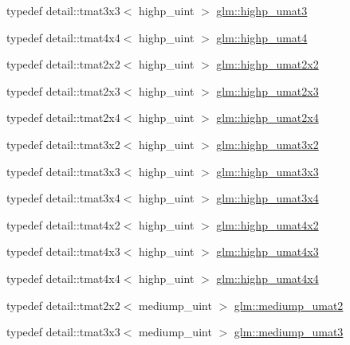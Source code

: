 \begin{DoxyCompactItemize}
\item 
typedef detail\+::tmat3x3$<$ highp\+\_\+uint $>$ \hyperlink{group__gtc__matrix__integer_ga0d2f0c76700809151e4582977bdc4c1d}{glm\+::highp\+\_\+umat3}
\item 
typedef detail\+::tmat4x4$<$ highp\+\_\+uint $>$ \hyperlink{group__gtc__matrix__integer_gabf91e4747e9aad3d2b58c79da5d9b0d3}{glm\+::highp\+\_\+umat4}
\item 
typedef detail\+::tmat2x2$<$ highp\+\_\+uint $>$ \hyperlink{group__gtc__matrix__integer_ga3d03c649a79dcf3c8b3f766e1c5e7870}{glm\+::highp\+\_\+umat2x2}
\item 
typedef detail\+::tmat2x3$<$ highp\+\_\+uint $>$ \hyperlink{group__gtc__matrix__integer_ga423c173624bfed5e27073987eecf06c2}{glm\+::highp\+\_\+umat2x3}
\item 
typedef detail\+::tmat2x4$<$ highp\+\_\+uint $>$ \hyperlink{group__gtc__matrix__integer_ga6989ecc7d0dda60f3c9c9465e9243a78}{glm\+::highp\+\_\+umat2x4}
\item 
typedef detail\+::tmat3x2$<$ highp\+\_\+uint $>$ \hyperlink{group__gtc__matrix__integer_gae054a2e2dcecb6d435acc15a25d53ba5}{glm\+::highp\+\_\+umat3x2}
\item 
typedef detail\+::tmat3x3$<$ highp\+\_\+uint $>$ \hyperlink{group__gtc__matrix__integer_ga0860bb2a1d49e039eac312c6ad4a1c65}{glm\+::highp\+\_\+umat3x3}
\item 
typedef detail\+::tmat3x4$<$ highp\+\_\+uint $>$ \hyperlink{group__gtc__matrix__integer_ga6fd3ea8bf5ccfc7548bbf3e687a05022}{glm\+::highp\+\_\+umat3x4}
\item 
typedef detail\+::tmat4x2$<$ highp\+\_\+uint $>$ \hyperlink{group__gtc__matrix__integer_gaa9500361295c8c2fd8bee2b77491a405}{glm\+::highp\+\_\+umat4x2}
\item 
typedef detail\+::tmat4x3$<$ highp\+\_\+uint $>$ \hyperlink{group__gtc__matrix__integer_ga6de5237bcae8a908a095d97d3ca74bdd}{glm\+::highp\+\_\+umat4x3}
\item 
typedef detail\+::tmat4x4$<$ highp\+\_\+uint $>$ \hyperlink{group__gtc__matrix__integer_ga8600f9e6e566b3dee70de37dafd2bd8c}{glm\+::highp\+\_\+umat4x4}
\item 
typedef detail\+::tmat2x2$<$ mediump\+\_\+uint $>$ \hyperlink{group__gtc__matrix__integer_gaba421c81f872757146b0adb7a954e349}{glm\+::mediump\+\_\+umat2}
\item 
typedef detail\+::tmat3x3$<$ mediump\+\_\+uint $>$ \hyperlink{group__gtc__matrix__integer_ga126ed770ed9106de1441a5a788e6485d}{glm\+::mediump\+\_\+umat3}
\item 

\end{DoxyCompactItemize}
